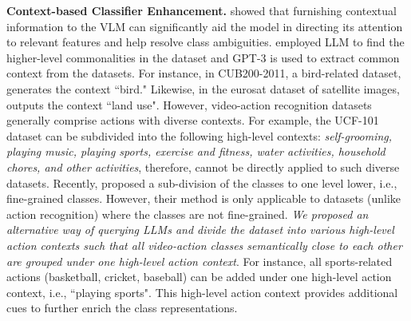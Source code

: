 \documentclass{article} \usepackage{iclr2024_conference,times}
\begin{document}
\textbf{Context-based Classifier Enhancement.}
\citep{roth2023waffling, novack2023chils} showed that furnishing contextual information to the VLM can significantly aid the model in directing its attention to relevant features and help resolve class ambiguities. \citep{roth2023waffling} employed LLM  to find the higher-level commonalities in the dataset and GPT-3 is used to extract common context from the datasets. For instance, in CUB200-2011, a bird-related dataset,\citep{roth2023waffling} generates the context ``bird." Likewise, in the eurosat dataset of satellite images, \citep{roth2023waffling} outputs the context ``land use". However,  video-action recognition datasets \citep{kay2017kinetics, kuehne2011hmdb, soomro2012ucf101} generally comprise actions with diverse contexts. For example, the UCF-101 dataset can be subdivided into the following high-level contexts: \emph{self-grooming, playing music, playing sports, exercise and fitness, water activities, household chores, and other activities}, therefore, \citep{roth2023waffling} cannot be directly applied to such diverse datasets. Recently, \citep{novack2023chils} proposed a sub-division of the classes to one level lower, i.e., fine-grained classes. However, their method is only applicable to datasets (unlike action recognition) where the classes are not fine-grained. \emph{We proposed an alternative way of querying LLMs and divide the dataset into various high-level action contexts such that all video-action classes semantically close to each other are grouped under one high-level action context}. For instance, all sports-related actions (basketball, cricket, baseball) can be added under one high-level action context, i.e., ``playing sports". This high-level action context provides additional cues to further enrich the class representations.  
\end{document}
